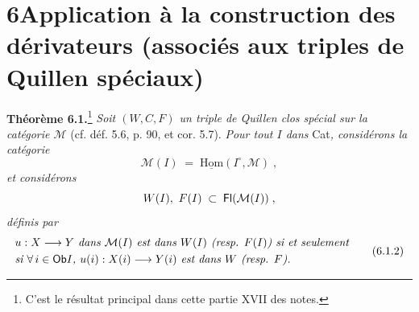 

\section*{6\quad Application à la construction des dérivateurs (associés aux triples de Quillen spéciaux)}

\textbf{Théorème 6.1.}\footnote[29]{C'est le résultat principal dans cette partie XVII des notes.} \textit{Soit $(W,C,F)$ un triple de Quillen clos spécial sur la catégorie $\mathcal{M}$} (cf. déf. 5.6, p. 90, et cor. 5.7). \textit{Pour tout $I$ dans} Cat\textit{, considérons la catégorie}
\[
\mathcal{M}(I) \;=\; \underline{\mathrm{Hom}}(I^{\circ},\mathcal{M}) \;, \tag*{(6.1.1)}
\]
\textit{et considérons}
\[
W(I),\ F(I) \;\subset\; \mathsf{Fl}(\mathcal{M}(I)) \;,
\]
\textit{définis par}
\[
\begin{aligned}
&\text{\textit{$u : X \longrightarrow Y$ dans $\mathcal{M}(I)$ est dans $W(I)$ (resp. $F(I)$) si et seulement}}\\
&\text{\textit{si $\forall\, i \in \Ob I$, $u(i) : X(i) \longrightarrow Y(i)$ est dans $W$ (resp. $F$).}}
\end{aligned}
\tag*{(6.1.2)}
\]

